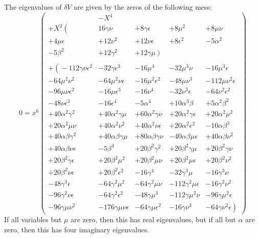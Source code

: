 \documentclass[12pt]{article}
\begin{document}
 The eigenvalues of $\delta V$ are given by the zeros of the
following mess:
\begin{equation}
0 =
x^6 \left(  
\begin{array}{ccccc}
& - X^4 & & & \\
+X^2 \left( \right. &16\gamma\nu &+ 8\gamma\epsilon &+ 8\mu^2 &+ 8\mu\nu \\
+ 4\mu\epsilon &+ 12\nu^2 &+ 12\nu\epsilon &+ 8\epsilon^2 &- 5\alpha^2 \\
- 5\beta^2 &+ 12\gamma^2 &+ \left. 12\gamma\mu \right) & &\\
& & & & \\
+\left( \right.- 112\gamma\nu\epsilon^2 &- 32\gamma\epsilon^3 &- 16\mu^4 
&- 32\mu^3\nu &- 16\mu^3\epsilon \\
- 64\mu^2\nu^2 &- 64\mu^2\nu\epsilon &- 16\mu^2\epsilon^2 
&- 48\mu\nu^3  &- 112\mu\nu^2\epsilon \\
- 96\mu\nu\epsilon^2 &- 16\mu\epsilon^3 &- 16\nu^4 
&- 32\nu^3\epsilon &- 64\nu^2\epsilon^2 \\
- 48\nu\epsilon^3 &- 16\epsilon^4 &- 5\alpha^4 &+ 10\alpha^3\beta  
&+ 5\alpha^2\beta^2 \\
+ 40\alpha^2\gamma^2 &+ 40\alpha^2\gamma\mu &+ 60\alpha^2\gamma\nu  
&+ 20\alpha^2\gamma\epsilon &+ 20\alpha^2\mu^2 \\
+ 20\alpha^2\mu\nu &+ 40\alpha^2\nu^2  &+ 40\alpha^2\nu\epsilon 
&+ 20\alpha^2\epsilon^2 &- 10\alpha\beta^3 \\
+ 40\alpha\beta\gamma^2 &+ 40\alpha\beta\gamma\mu
&+ 80\alpha\beta\gamma\nu &- 40\alpha\beta\mu\epsilon 
&+ 40\alpha\beta\nu^2 \\
+ 40\alpha\beta\nu\epsilon &- 5\beta^4 &+ 20\beta^2\gamma^2  
&+ 20\beta^2\gamma\mu &+ 20\beta^2\gamma\nu \\
+ 20\beta^2\gamma\epsilon &+ 20\beta^2\mu^2  &+ 20\beta^2\mu\nu 
&+ 20\beta^2\mu\epsilon &+ 20\beta^2\nu^2 \\
+ 20\beta^2\nu\epsilon &+ 20\beta^2\epsilon^2 &- 16\gamma^4 
&- 32\gamma^3\mu &- 16\gamma^3\nu \\
- 48\gamma^3\epsilon &- 64\gamma^2\mu^2 &- 64\gamma^2\mu\nu
&- 112\gamma^2\mu\epsilon &- 16\gamma^2\nu^2 \\
- 96\gamma^2\nu\epsilon &- 64\gamma^2\epsilon^2 &- 48\gamma\mu^3
&- 112\gamma\mu^2\nu &- 96\gamma\mu^2\epsilon \\
- 96\gamma\mu\nu^2 &- 176\gamma\mu\nu\epsilon
&- 64\gamma\mu\epsilon^2 &- 16\gamma\nu^3 &- 64\gamma\nu^2\epsilon 
\left. \right)
\end{array}
 \right)
\end{equation}
 If all variables but $\mu$ are zero, then this has real eigenvalues,
but if all but $\alpha$ are zero, then this has four imaginary
eigenvalues.
\end{document}
